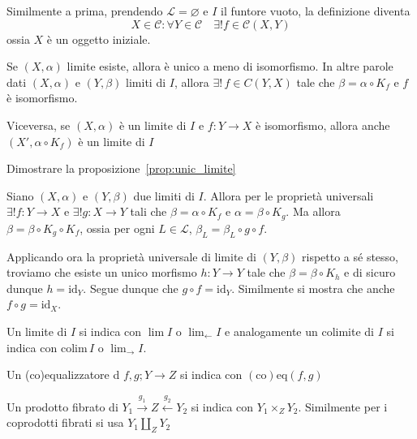 \begin{example}{}
    Similmente a prima, prendendo \(\mathcal{L} = \varnothing\) e \(I\) il
    funtore vuoto, la definizione diventa
    \[
      X \in \mathcal{C} : \forall Y \in \mathcal{C}\quad \exists ! f \in \mathcal{C}{(X, Y)}
    \]
    ossia \(X\) è un oggetto iniziale.
\end{example}

\begin{proposition}\label{prop:unic_limite}
    Se \({(X, \alpha)}\) limite esiste, allora è unico a meno di isomorfismo. In
    altre parole dati \({(X, \alpha)}\) e \({(Y, \beta)}\) limiti di \(I\),
    allora \(\exists ! \, f \in C{(Y, X)}\) tale che \(\beta = \alpha \circ
    K_f\) e \(f \) è isomorfismo.

    Viceversa, se \({(X, \alpha)}\) è un limite di \(I\) e \(f : Y \to X\) è
    isomorfismo, allora anche \({(X', \alpha \circ K_f)}\) è un limite di \(I\) 
\end{proposition}
\begin{eser}{}
    Dimostrare la proposizione~\ref{prop:unic_limite}
    \tcblower

    Siano \({(X, \alpha)}\) e \({(Y, \beta)}\) due limiti di \(I\). Allora
    per le proprietà universali \(\exists ! f : Y \to X\) e \(\exists !
    g : X \to Y\) tali che \(\beta = \alpha \circ K_f\) e \(\alpha = \beta \circ
    K_g\). Ma allora \(\beta = \beta \circ K_g \circ K_f\), ossia per ogni \(L
    \in \mathcal{L}\), \(\beta_L = \beta_L \circ g \circ f\).

    Applicando ora la proprietà universale di limite di \({(Y, \beta)}\)
    rispetto a sé stesso, troviamo che esiste un unico morfismo \(h : Y \to Y\)
    tale che \(\beta = \beta \circ K_h\) e di sicuro dunque \(h =
    \mathrm{id}_Y\). Segue dunque che \(g \circ f = \mathrm{id}_Y\). Similmente
    si mostra che anche \(f \circ g = \mathrm{id}_X\).
\end{eser}

\begin{note}[zione]
    Un limite di \(I\) si indica con \(\lim I \) o \(\displaystyle\lim_{\longleftarrow} I \)
    e analogamente un colimite di \(I\) si indica con \(\mathrm{colim} \, I\) o
    \(\displaystyle\lim_{\longrightarrow} I\).

    Un (co)equalizzatore d \(f, g ; Y \to Z\) si indica con \(\mathrm{(co)eq} {(f, g)}\)


    Un prodotto fibrato di \(Y_{1} \overset{g_{1}}{\to } Z
    \overset{g_{2}}{\leftarrow} Y_{2}\) si indica con \(Y_{1} \times_Z Y_{2}\).
    Similmente per i coprodotti fibrati si usa \(Y_{1} \coprod_Z Y_{2}\) 
\end{note}

